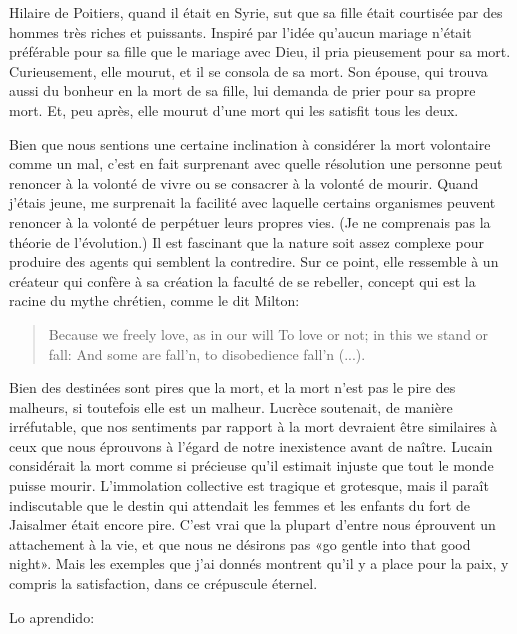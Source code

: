 \documentclass[a4paper, 12pt]{article}
\begin{document}
Hilaire de Poitiers, quand il était en Syrie, sut que sa fille était courtisée
par des hommes très riches et puissants. Inspiré par l'idée qu'aucun mariage
n'était préférable pour sa fille que le mariage avec Dieu, il pria pieusement
pour sa mort. Curieusement, elle mourut, et il se consola de sa mort. Son
épouse, qui trouva aussi du bonheur en la mort de sa fille, lui demanda de prier
pour sa propre mort. Et, peu après, elle mourut d'une mort qui les satisfit tous
les deux.

Bien que nous sentions une certaine inclination à considérer la mort volontaire
comme un mal, c'est en fait surprenant avec quelle résolution une personne peut
renoncer à la volonté de vivre ou se consacrer à la volonté de mourir. Quand
j'étais jeune, me surprenait la facilité avec laquelle certains organismes
peuvent renoncer à la volonté de perpétuer leurs propres vies. (Je ne comprenais
pas la théorie de l'évolution.) Il est fascinant que la nature soit assez
complexe pour produire des agents qui semblent la contredire. Sur ce point, elle
ressemble à un créateur qui confère à sa création la faculté de se rebeller,
concept qui est la racine du mythe chrétien, comme le dit Milton:

\begin{quote}
Because we freely love, as in our will\newline
To love or not; in this we stand or fall:\newline
And some are fall'n, to disobedience fall'n (...).
\end{quote}

Bien des destinées sont pires que la mort, et la mort n'est pas le pire des
malheurs, si toutefois elle est un malheur. Lucrèce soutenait, de manière
irréfutable, que nos sentiments par rapport à la mort devraient être similaires
à ceux que nous éprouvons à l'égard de notre inexistence avant de naître. Lucain
considérait la mort comme si précieuse qu'il estimait injuste que tout le monde
puisse mourir. L'immolation collective est tragique et grotesque, mais il paraît
indiscutable que le destin qui attendait les femmes et les enfants du fort de
Jaisalmer était encore pire. C'est vrai que la plupart d'entre nous éprouvent un
attachement à la vie, et que nous ne désirons pas «go gentle into that good
night». Mais les exemples que j'ai donnés montrent qu'il y a place pour la paix,
y compris la satisfaction, dans ce crépuscule éternel.

\pagebreak

Lo aprendido:
\end{document}
